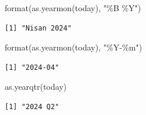 \documentclass[
  letterpaper,
  DIV=11,
  numbers=noendperiod]{scrreprt}
\newenvironment{Shaded}{\begin{snugshade}}{\end{snugshade}}
\newcommand{\AttributeTok}[1]{\textcolor[rgb]{0.40,0.45,0.13}{#1}}
\newcommand{\CommentTok}[1]{\textcolor[rgb]{0.37,0.37,0.37}{#1}}
\newcommand{\FunctionTok}[1]{\textcolor[rgb]{0.28,0.35,0.67}{#1}}
\newcommand{\NormalTok}[1]{\textcolor[rgb]{0.00,0.23,0.31}{#1}}
\newcommand{\OtherTok}[1]{\textcolor[rgb]{0.00,0.23,0.31}{#1}}
\newcommand{\SpecialCharTok}[1]{\textcolor[rgb]{0.37,0.37,0.37}{#1}}
\newcommand{\StringTok}[1]{\textcolor[rgb]{0.13,0.47,0.30}{#1}}
\begin{document}
\begin{Shaded}
\begin{Highlighting}[]
\FunctionTok{format}\NormalTok{(}\FunctionTok{as.yearmon}\NormalTok{(today), }\StringTok{"\%B \%Y"}\NormalTok{)}
\end{Highlighting}
\end{Shaded}

\begin{verbatim}
[1] "Nisan 2024"
\end{verbatim}

\begin{Shaded}
\begin{Highlighting}[]
\FunctionTok{format}\NormalTok{(}\FunctionTok{as.yearmon}\NormalTok{(today), }\StringTok{"\%Y{-}\%m"}\NormalTok{)}
\end{Highlighting}
\end{Shaded}

\begin{verbatim}
[1] "2024-04"
\end{verbatim}

\begin{Shaded}
\begin{Highlighting}[]
\FunctionTok{as.yearqtr}\NormalTok{(today)}
\end{Highlighting}
\end{Shaded}

\begin{verbatim}
[1] "2024 Q2"
\end{verbatim}

\begin{Shaded}
\end{Shaded}
\end{document}

